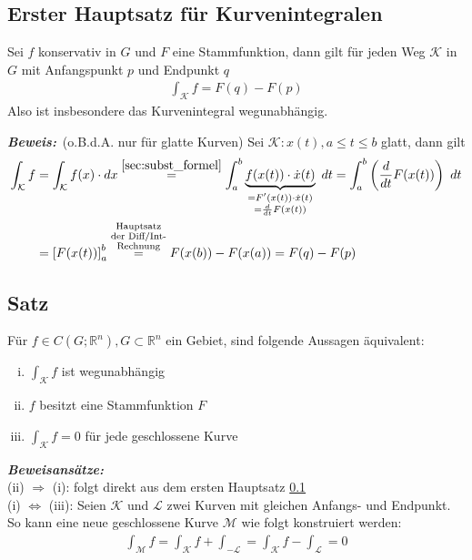 \documentclass[11pt,a4paper]{book}
\newcommand {\Rn}	{\mathbb{R}^n}
\newcommand{\1}    	{\mathbbm{1}}
\newcommand{\Kurve}	{{\mathcal{K}}}
\newcommand{\Beweis}[1][Beweis]
{\begin{mdframed}[backgroundcolor=gray!10,linewidth=0pt]\noindent\textit{\textbf{{#1}:}}~}
\newcommand{\QED}	{\end{mdframed}}
\begin{document}
\subsection{Erster Hauptsatz für Kurvenintegralen}
\label{sec:HS_kurvenint}
Sei \(f\) konservativ in \(G\) und \(F\) eine Stammfunktion, dann gilt für jeden Weg \(\Kurve\) in \(G\) mit Anfangspunkt \(p\) und Endpunkt \(q\)
\begin{align*}
	\int_\Kurve f = F(q) - F(p)
\end{align*}
Also ist insbesondere das Kurvenintegral wegunabhängig.

\Beweis (o.B.d.A. nur für glatte Kurven) Sei \(\Kurve : x(t), a \leqslant t \leqslant b\) glatt, dann gilt
\begin{align*}
	\int_\Kurve f &= \int_\Kurve f(x) \cdot dx \stackrel{\ref{sec:subst_formel}}{=}
	\int_a^b \underbrace{f(x(t))\cdot\dot{x}(t)}
	_{\substack{
		= F'(x(t))\cdot\dot{x}(t) \\
		= \frac{d}{dt} F(x(t))
	}} ~dt =
	\int_a^b \left( \frac{d}{dt} F(x(t)) \right)~dt \\
	&= \left[ F(x(t)) \right]_a^b \stackrel{\substack{\textrm{Hauptsatz}\\\textrm{der Diff/Int-}\\\textrm{Rechnung}}}{=} F(x(b)) - F(x(a)) = F(q) - F(p)
\end{align*}
\QED

\subsection{Satz}
Für \(f \in C(G;\Rn), G \subset \Rn\) ein Gebiet, sind folgende Aussagen äquivalent:
\begin{enumerate}[(i)]
	\item \(\int_\Kurve f\) ist wegunabhängig
	\item \(f\) besitzt eine Stammfunktion \(F\)
	\item \(\int_\Kurve f = 0\) für jede geschlossene Kurve
\end{enumerate}
\Beweis[Beweisansätze]\\
(ii) \(\Rightarrow\) (i): folgt direkt aus dem ersten Hauptsatz \ref{sec:HS_kurvenint}\\
(i) \(\Leftrightarrow\) (iii): Seien \(\Kurve\) und \(\mathcal{L}\) zwei Kurven mit gleichen Anfangs- und Endpunkt. So kann eine neue geschlossene Kurve \(\mathcal{M}\) wie folgt konstruiert werden:
\begin{align*}
	\int_\mathcal{M} f = \int_\Kurve f + \int_{-\mathcal{L}} = \int_\Kurve f - \int_{\mathcal{L}} = 0
\end{align*}
\QED
\end{document}
